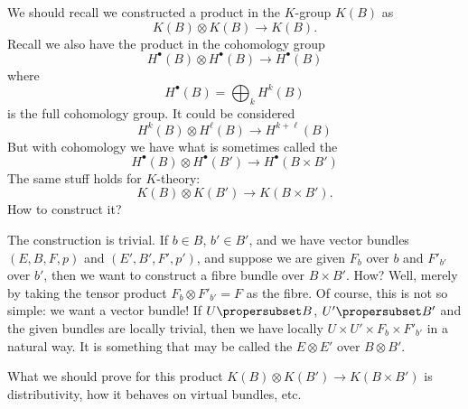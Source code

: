 We should recall we constructed a product in the $K$-group $K(B)$
as
\begin{equation}
K(B)\otimes K(B)\to K(B).
\end{equation}
Recall we also have the product in the cohomology group
\begin{equation}
H^{\bullet}(B)\otimes H^{\bullet}(B)\to H^{\bullet}(B)
\end{equation}
where
\begin{equation}
H^{\bullet}(B)=\bigoplus_{k}H^{k}(B)
\end{equation}
is the full cohomology group. It could be considered
\begin{equation}
H^{k}(B)\otimes H^{\ell}(B)\to H^{k+\ell}(B)
\end{equation}
But with cohomology we have what is sometimes called the
\begin{equation}
H^{\bullet}(B)\otimes H^{\bullet}(B')\to H^{\bullet}(B\times B')
\end{equation}
The same stuff holds for $K$-theory:
\begin{equation}
K(B)\otimes K(B')\to K(B\times B').
\end{equation}
How to construct it?

The construction is trivial. If $b\in B$, $b'\in B'$, and we have
vector bundles $(E,B,F,p)$ and $(E',B',F',p')$, and suppose we
are given $F_{b}$ over $b$ and $F'_{b'}$ over $b'$, then we want to
construct a fibre bundle over $B\times B'$. How? Well, merely by
taking the tensor product $F_{b}\otimes F'_{b'}=F$ as the
fibre. Of course, this is not so simple: we want a vector bundle!
If $U\propersubset B$, $U'\propersubset B'$ and the given bundles
are locally trivial, then we have locally $U\times U'\times
F_{b}\times F'_{b'}$ in a natural way. It is something that may
be called the 
$E\otimes E'$ over $B\otimes B'$.

What we should prove for this product $K(B)\otimes K(B')\to
K(B\times B')$ is distributivity, how it behaves on virtual
bundles, etc.

